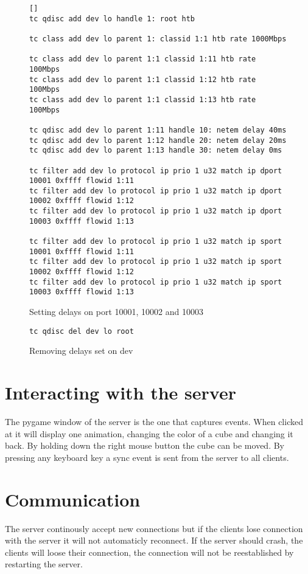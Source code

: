 \begin{figure}[h! ]
\begin{verbatim}[]
tc qdisc add dev lo handle 1: root htb

tc class add dev lo parent 1: classid 1:1 htb rate 1000Mbps

tc class add dev lo parent 1:1 classid 1:11 htb rate 100Mbps
tc class add dev lo parent 1:1 classid 1:12 htb rate 100Mbps
tc class add dev lo parent 1:1 classid 1:13 htb rate 100Mbps

tc qdisc add dev lo parent 1:11 handle 10: netem delay 40ms
tc qdisc add dev lo parent 1:12 handle 20: netem delay 20ms
tc qdisc add dev lo parent 1:13 handle 30: netem delay 0ms

tc filter add dev lo protocol ip prio 1 u32 match ip dport 10001 0xffff flowid 1:11
tc filter add dev lo protocol ip prio 1 u32 match ip dport 10002 0xffff flowid 1:12
tc filter add dev lo protocol ip prio 1 u32 match ip dport 10003 0xffff flowid 1:13

tc filter add dev lo protocol ip prio 1 u32 match ip sport 10001 0xffff flowid 1:11
tc filter add dev lo protocol ip prio 1 u32 match ip sport 10002 0xffff flowid 1:12
tc filter add dev lo protocol ip prio 1 u32 match ip sport 10003 0xffff flowid 1:13
\end{verbatim}
\caption{Setting delays on port 10001, 10002 and 10003}
\end{figure}

\begin{figure}[h!]
\begin{verbatim}
tc qdisc del dev lo root
\end{verbatim}
\caption{Removing delays set on dev}
\end{figure}

\section{Interacting with the server}
The pygame window of the server is the one that captures events. When clicked at it will display one animation, changing the color of a cube and changing it back. By holding down the right mouse button the cube can be moved. By pressing any keyboard key a sync event is sent from the server to all clients. 

\section{Communication}
The server continously accept new connections but if the clients lose connection with the server it will not automaticly reconnect. If the server should crash, the clients will loose their connection, the connection will not be reestablished by restarting the server.

